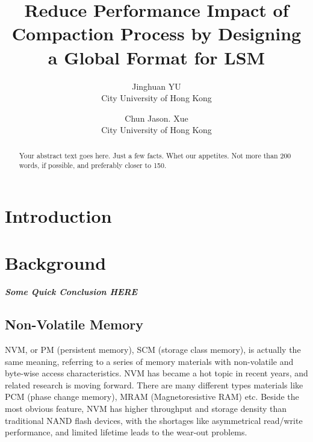 \usepackage{filecontents}




\date{}

\title{\Large \bf Reduce Performance Impact of Compaction Process by Designing a Global Format for LSM}

\author{
{\rm Jinghuan YU}\\
City University of Hong Kong
\and
{\rm Chun Jason. Xue}\\
City University of Hong Kong
} %

\maketitle

\begin{abstract}
Your abstract text goes here. Just a few facts. Whet our appetites.
Not more than 200 words, if possible, and preferably closer to 150.
\end{abstract}


\section{Introduction}

\section{Background}
\textbf{\textit{ Some Quick Conclusion HERE}}

\subsection{Non-Volatile Memory}
NVM, or PM (persistent memory), SCM (storage class memory), is actually the same meaning, referring to a series of memory materials with non-volatile and byte-wise access characteristics. NVM has became a hot topic in recent years, and related research is moving forward. There are many different types materials like PCM (phase change memory), MRAM (Magnetoresistive RAM) etc. Beside the most obvious feature, NVM has higher throughput and storage density than traditional NAND flash devices, with the shortages like asymmetrical read/write performance, and limited lifetime leads to the wear-out problems.

